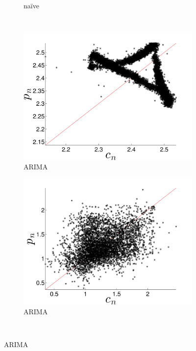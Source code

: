 \begin{figure}[htbp]
\begin{subfigure}{0.48\columnwidth}
    \caption{\gcc na\"ive }
    \label{fig:gccMEAN}
  \end{subfigure}%
  \\
    \begin{subfigure}{0.48\columnwidth}
    \includegraphics[width=\columnwidth]{figs/colARIMAForecast}
    \caption{\col ARIMA}
    \label{fig:colARIMA}
  \end{subfigure}
  \begin{subfigure}{0.48\columnwidth}
    \includegraphics[width=\columnwidth]{figs/gccARIMAForecast}
    \caption{\gcc ARIMA }
    \label{fig:gccARIMA}
  \end{subfigure}%
  \\
  

\end{figure}
